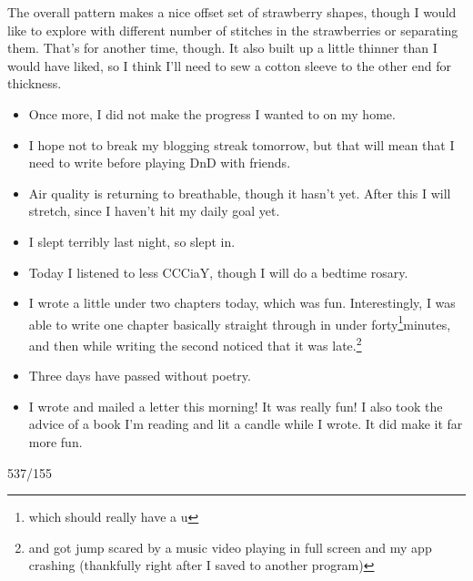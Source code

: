 \documentclass[12pt]{article}[titlepage]
\newcommand{\1}{\={a}}
\newcommand{\2}{\={e}}
\newcommand{\3}{\={\i}}
\newcommand{\4}{\=o}
\newcommand{\5}{\=u}
\newcommand{\6}{\={A}}
\renewcommand{\,}{\textsuperscript{,}}
\begin{document}
The overall pattern makes a nice offset set of strawberry shapes, though I would like to explore with different number of stitches in the strawberries or separating them.
That's for another time, though.
It also built up a little thinner than I would have liked, so I think I'll need to sew a cotton sleeve to the other end for thickness.

\begin{itemize}
\item Once more, I did not make the progress I wanted to on my home.
\item I hope not to break my blogging streak tomorrow, but that will mean that I need to write before playing DnD with friends.
\item Air quality is returning to breathable, though it hasn't yet. After this I will stretch, since I haven't hit my daily goal yet.
\item I slept terribly last night, so slept in.
\item Today I listened to less CCCiaY, though I will do a bedtime rosary.
\item I wrote a little under two chapters today, which was fun. Interestingly, I was able to write one chapter basically straight through in under forty\footnote{which should really have a u}minutes, and then while writing the second noticed that it was late.\footnote{and got jump scared by a music video playing in full screen and my app crashing (thankfully right after I saved to another program)}
\item Three days have passed without poetry. 
\item I wrote and mailed a letter this morning! It was really fun! I also took the advice of a book I'm reading and lit a candle while I wrote. It did make it far more fun.
\end{itemize}

537/155
\end{document}
